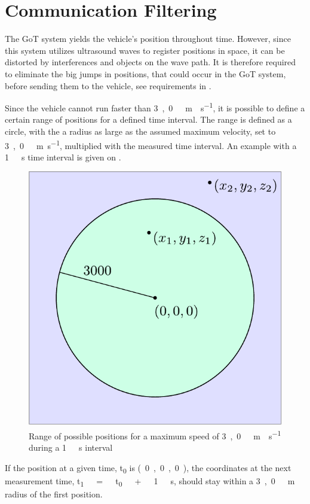 \section{Communication Filtering}
The GoT system yields the vehicle's position throughout time. However, since this system utilizes ultrasound waves to register positions in space, it can be distorted by interferences and objects on the wave path. It is therefore required to eliminate the big jumps in positions, that could occur in the GoT system, before sending them to the vehicle, see requirements in .

Since the vehicle cannot run faster than \si{3,0\ m \cdot s^{-1}}, it is possible to define a certain range of positions for a defined time interval. The range is defined as a circle, with the a radius as large as the assumed maximum velocity, set to \si{3,0\ m.s^{-1}}, multiplied with the measured time interval. An example with a \si{1\ s} time interval is given on .
%
\begin{figure}[H]
  \centering
  \includegraphics[scale=0.6]{figures/GoTFilterSimple.pdf}
  \caption{Range of possible positions for a maximum speed of \si{3,0\ m \cdot s^{-1}} during a \si{1\ s} interval}
  \label{GoTFilterSimple}
\end{figure}
%
If the position at a given time, \si{t_0} is \si{(0,0,0)}, the coordinates at the next measurement time, \si{t_1\ =\ t_0\ +\ 1\ s}, should stay within a \si{3,0\ m} radius of the first position.


